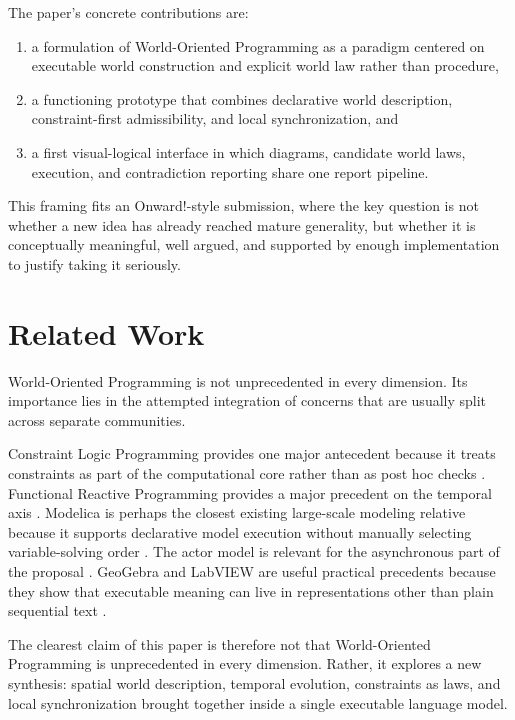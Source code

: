 \documentclass[sigplan,review,anonymous]{acmart}
\begin{document}
The paper's concrete contributions are:
\begin{enumerate}
\item a formulation of World-Oriented Programming as a paradigm centered on executable world construction and explicit world law rather than procedure,
\item a functioning prototype that combines declarative world description, constraint-first admissibility, and local synchronization, and
\item a first visual-logical interface in which diagrams, candidate world laws, execution, and contradiction reporting share one report pipeline.
\end{enumerate}

This framing fits an Onward!-style submission, where the key question is not whether a new idea has already reached mature generality, but whether it is conceptually meaningful, well argued, and supported by enough implementation to justify taking it seriously.

\section{Related Work}

World-Oriented Programming is not unprecedented in every dimension.
Its importance lies in the attempted integration of concerns that are usually split across separate communities.

Constraint Logic Programming provides one major antecedent because it treats constraints as part of the computational core rather than as post hoc checks \cite{jaffar1987clp}.
Functional Reactive Programming provides a major precedent on the temporal axis \cite{hudak1999frp,elliott1997fra}.
Modelica is perhaps the closest existing large-scale modeling relative because it supports declarative model execution without manually selecting variable-solving order \cite{modelica2023spec}.
The actor model is relevant for the asynchronous part of the proposal \cite{hewitt1973actor}.
GeoGebra and LabVIEW are useful practical precedents because they show that executable meaning can live in representations other than plain sequential text \cite{geogebra,ni2026labview}.

The clearest claim of this paper is therefore not that World-Oriented Programming is unprecedented in every dimension.
Rather, it explores a new synthesis: spatial world description, temporal evolution, constraints as laws, and local synchronization brought together inside a single executable language model.
\end{document}
